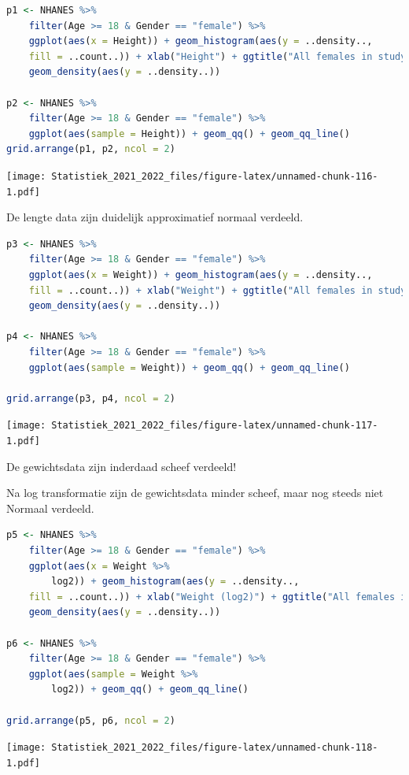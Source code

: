 \documentclass[
  12pt,dutch,coursenotes]{book}
\theoremstyle{definition}
\theoremstyle{definition}
\theoremstyle{definition}
\theoremstyle{definition}
\theoremstyle{remark}
\begin{document}
\begin{lstlisting}[language=R]
p1 <- NHANES %>%
    filter(Age >= 18 & Gender == "female") %>%
    ggplot(aes(x = Height)) + geom_histogram(aes(y = ..density..,
    fill = ..count..)) + xlab("Height") + ggtitle("All females in study") +
    geom_density(aes(y = ..density..))

p2 <- NHANES %>%
    filter(Age >= 18 & Gender == "female") %>%
    ggplot(aes(sample = Height)) + geom_qq() + geom_qq_line()
grid.arrange(p1, p2, ncol = 2)
\end{lstlisting}

\texttt{[image: Statistiek\_2021\_2022\_files/figure-latex/unnamed-chunk-116-1.pdf]}

De lengte data zijn duidelijk approximatief normaal verdeeld.

\begin{lstlisting}[language=R]
p3 <- NHANES %>%
    filter(Age >= 18 & Gender == "female") %>%
    ggplot(aes(x = Weight)) + geom_histogram(aes(y = ..density..,
    fill = ..count..)) + xlab("Weight") + ggtitle("All females in study") +
    geom_density(aes(y = ..density..))

p4 <- NHANES %>%
    filter(Age >= 18 & Gender == "female") %>%
    ggplot(aes(sample = Weight)) + geom_qq() + geom_qq_line()

grid.arrange(p3, p4, ncol = 2)
\end{lstlisting}

\texttt{[image: Statistiek\_2021\_2022\_files/figure-latex/unnamed-chunk-117-1.pdf]}

De gewichtsdata zijn inderdaad scheef verdeeld!

Na log transformatie zijn de gewichtsdata minder scheef, maar nog steeds niet Normaal verdeeld.

\begin{lstlisting}[language=R]
p5 <- NHANES %>%
    filter(Age >= 18 & Gender == "female") %>%
    ggplot(aes(x = Weight %>%
        log2)) + geom_histogram(aes(y = ..density..,
    fill = ..count..)) + xlab("Weight (log2)") + ggtitle("All females in study") +
    geom_density(aes(y = ..density..))

p6 <- NHANES %>%
    filter(Age >= 18 & Gender == "female") %>%
    ggplot(aes(sample = Weight %>%
        log2)) + geom_qq() + geom_qq_line()

grid.arrange(p5, p6, ncol = 2)
\end{lstlisting}

\texttt{[image: Statistiek\_2021\_2022\_files/figure-latex/unnamed-chunk-118-1.pdf]}
\end{document}

